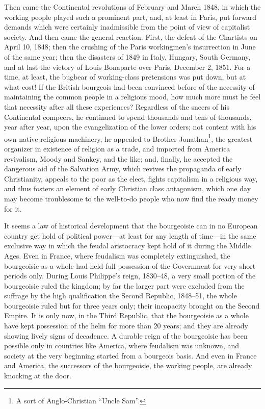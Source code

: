 Then came the Continental revolutions of February and March 1848, in which the
working people played such a prominent part, and, at least in Paris, put
forward demands which were certainly inadmissible from the point of view of
capitalist society. And then came the general reaction. First, the defeat of the
Chartists on April 10, 1848; then the crushing of the Paris workingmen's
insurrection in June of the same year; then the disasters of 1849 in Italy,
Hungary, South Germany, and at last the victory of Louis Bonaparte over Paris,
December 2, 1851. For a time, at least, the bugbear of working-class pretensions
was put down, but at what cost! If the British bourgeois had been convinced
before of the necessity of maintaining the common people in a religious mood,
how much more must he feel that necessity after all these experiences?
Regardless of the sneers of his Continental compeers, he continued to spend
thousands and tens of thousands, year after year, upon the evangelization of the
lower orders; not content with his own native religious machinery, he appealed
to Brother Jonathan\footnote{A sort of Anglo-Christian ``Uncle Sam''.}, the
greatest organizer in existence of religion as a trade, and imported from
America revivalism, Moody and Sankey, and the like; and, finally, he accepted
the dangerous aid of the Salvation Army, which revives the propaganda of early
Christianity, appeals to the poor as the elect, fights capitalism in a religious
way, and thus fosters an element of early Christian class antagonism, which one
day may become troublesome to the well-to-do people who now find the ready money
for it.

It seems a law of historical development that the bourgeoisie can in no European
country get hold of political power---at least for any length of time---in the
same exclusive way in which the feudal aristocracy kept hold of it during the
Middle Ages. Even in France, where feudalism was completely extinguished, the
bourgeoisie as a whole had held full possession of the Government for very short
periods only. During Louis Philippe's reign, 1830--48, a very small portion of
the bourgeoisie ruled the kingdom; by far the larger part were excluded from the
suffrage by the high qualification the Second Republic, 1848--51, the whole
bourgeoisie ruled but for three years only; their incapacity brought on the
Second Empire. It is only now, in the Third Republic, that the bourgeoisie as a
whole have kept possession of the helm for more than 20 years; and they are
already showing lively signs of decadence. A durable reign of the bourgeoisie
has been possible only in countries like America, where feudalism was unknown,
and society at the very beginning started from a bourgeois basis. And even in
France and America, the successors of the bourgeoisie, the working people, are
already knocking at the door.

